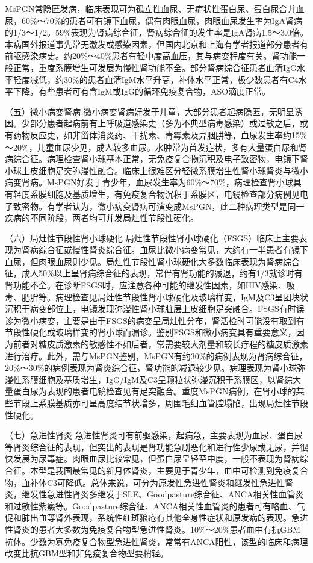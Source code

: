 MsPGN常隐匿发病，临床表现可为孤立性血尿、无症状性蛋白尿、蛋白尿合并血尿，60\%～70\%的患者可有镜下血尿，偶有肉眼血尿，肉眼血尿发生率为IgA肾病的1/3～1/2。59\%表现为肾病综合征，肾病综合征的发生率是IgA肾病1.5～3.0倍。本病国外报道事先常无激发或感染因素，但国内北京和上海有学者报道部分患者有前驱感染病史。约20\%～40\%患者有轻中度高血压，其与病变程度有关。肾功能一般正常，重度系膜增生可发展为慢性肾功能不全。部分肾病综合征患者血清IgG水平轻度减低，约30\%的患者血清IgM水平升高，补体水平正常，极少数患者有C4水平下降，有些患者可有含IgM或IgG的循环免疫复合物，ASO滴度正常。

（五）微小病变肾病
微小病变肾病好发于儿童，大部分患者起病隐匿，无明显诱因。少部分患者起病前有上呼吸道感染史（多为不典型病毒感染）或过敏之后，或有药物反应史，如非甾体消炎药、干扰素、青霉素及异胭肼等，血尿发生率约15\%～20\%，儿童血尿少见，成人较多血尿。水肿常为首发症状，多有大量蛋白尿和肾病综合征。病理检查肾小球基本正常，无免疫复合物沉积及电子致密物，电镜下肾小球上皮细胞足突弥漫性融合。临床上很难区分轻微系膜增生性肾小球肾炎与微小病变肾病。MsPGN好发于青少年，血尿发生率为60\%～70\%，病理检查肾小球具有轻度系膜细胞及基质增生，有免疫复合物沉积于系膜区，电镜检查部分病例见电子致密物。有学者认为，微小病变肾病可演变成MsPGN，此二种病理类型是同一疾病的不同阶段，两者均可并发局灶性节段性硬化。

（六）局灶性节段性肾小球硬化
局灶性节段性肾小球硬化（FSGS）临床上主要表现为肾病综合征或慢性肾炎综合征。血尿比微小病变常见，大约有一半患者有镜下血尿，但肉眼血尿则少见。局灶性节段性肾小球硬化大多数临床表现为肾病综合征，成人50\%以上呈肾病综合征的表现，常伴有肾功能的减退，约有1/3就诊时有肾功能不全。在诊断FSGS时，应注意各种可能的继发性因素，如HIV感染、吸毒、肥胖等。病理检查见局灶性节段性肾小球硬化及玻璃样变，IgM及C3呈团块状沉积于病变部位上，电镜发现弥漫性肾小球脏层上皮细胞足突融合。FSGS有时误诊为微小病变，主要是由于FSGS的病变呈局灶性分布，肾活检时可能没有取到有节段性硬化或玻璃样变的肾小球而漏诊。鉴别FSGS和微小病变具有重要意义，因为前者对糖皮质激素的敏感性不如后者，常需要较大剂量和较长疗程的糖皮质激素进行治疗。此外，需与MsPGN鉴别，MsPGN有约30\%的病例表现为肾病综合征，20\%～30\%的病例表现为肾炎综合征，肾功能的减退较少见。病理表现为肾小球弥漫性系膜细胞及基质增生，IgG/IgM及C3呈颗粒状弥漫沉积于系膜区，以肾综大量蛋白尿为表现的患者电镜检查见有足突融合。重度MsPGN病例，在肾小球的某些节段上系膜基质亦可呈高度结节状增多，周围毛细血管腔塌陷，出现局灶性节段性硬化。

（七）急进性肾炎
急进性肾炎可有前驱感染，起病急，主要表现为血尿、蛋白尿等肾炎综合征的表现，但突出的表现是肾功能急剧恶化和进行性少尿或无尿，并很快发展为尿毒症。肉眼血尿比较常见，但蛋白尿呈轻至中度，一般不表现为肾病综合征。本型是我国最常见的新月体肾炎，主要见于青少年，血中可检测到免疫复合物，血补体C3可降低。总体来说，可分为原发性急进性肾炎和继发性急进性肾炎，继发性急进性肾炎多继发于SLE、Goodpasture综合征、ANCA相关性血管炎和过敏性紫癜等。Goodpasture综合征、ANCA相关性血管炎的患者可有咯血、气促和肺出血等肾外表现，系统性红斑狼疮有其他全身性症状和原发病的表现。急进性肾炎的患者大多数为免疫复合物型急进性肾炎。10\%～20\%患者血中有抗GBM抗体。少数为寡免疫复合物型急进性肾炎，常常有ANCA阳性，该型的临床和病理改变比抗GBM型和非免疫复合物型要稍轻。

